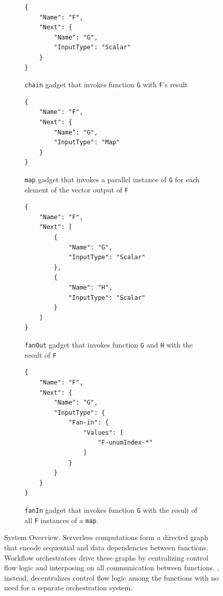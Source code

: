 \begin{figure}[t!]
    \centering
    \begin{subfigure}[t]{\columnwidth}
    \centering
        \begin{verbatim}
{
    "Name": "F",
    "Next": {
        "Name": "G",
        "InputType": "Scalar"
    }
}
    \end{verbatim}
        \caption{\texttt{chain} gadget that invokes function \texttt{G} with
        \texttt{F}'s result}
        \label{fig:gadget-examples-chain}
    \end{subfigure}
    \begin{subfigure}[t]{\columnwidth}
    \centering
        \begin{verbatim}
{
    "Name": "F",
    "Next": {
        "Name": "G",
        "InputType": "Map"
    }
}
        \end{verbatim}
        \caption{\texttt{map} gadget that invokes a parallel instance of
        \texttt{G} for each element of the vector output of \texttt{F}}
        \label{fig:gadget-examples-map}
    \end{subfigure}
    \hfill
    \begin{subfigure}[t]{\columnwidth}
    \centering
        \begin{verbatim}
{
    "Name": "F",
    "Next": [
        {
            "Name": "G",
            "InputType": "Scalar"
        },
        {
            "Name": "H",
            "InputType": "Scalar"
        }
    ]
}
        \end{verbatim}
        \caption{\texttt{fanOut} gadget that invokes function \texttt{G} and
        \texttt{H} with the result of \texttt{F}}
        \label{fig:gadget-examples-fanout}
    \end{subfigure}
    \begin{subfigure}[t]{\columnwidth}
    \centering
        \begin{verbatim}
{
    "Name": "F",
    "Next": {
        "Name": "G",
        "InputType": {
            "Fan-in": {
                "Values": [
                    "F-unumIndex-*"
                ]
            }
        }
    }
}
        \end{verbatim}
        \caption{\texttt{fanIn} gadget that invokes function \texttt{G} with
        the result of all \texttt{F} instances of a \texttt{map}.}
        \label{fig:gadget-examples-fanin}
    \end{subfigure}
    \caption{\name{} System Overview. Serverless computations form a directed
            graph that encode sequential and data dependencies between functions. Workflow
            orchestrators drive these graphs by centralizing control flow logic and
            interposing on all communication between functions. \name{},
            instead, decentralizes control flow logic among the functions with
            no need for a separate orchestration system.}
    \label{fig:arch2}
\end{figure}

